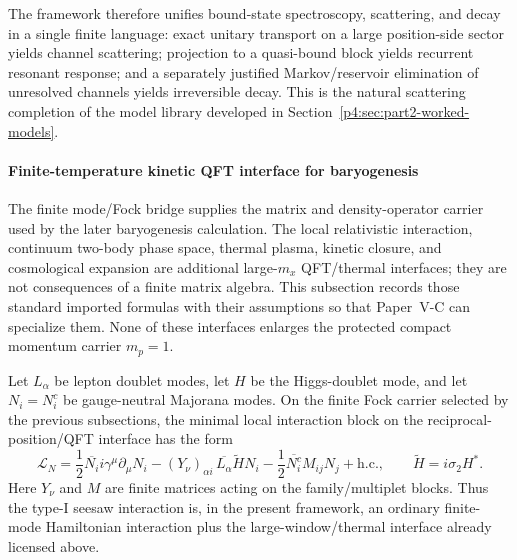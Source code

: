 \documentclass[12pt,a4paper]{article}
\begin{document}
\begin{remark}
\label{p4:rem:scattering-spectroscopy-bridge}
The framework therefore unifies bound-state spectroscopy, scattering, and decay in a single finite language:
exact unitary transport on a large position-side sector yields channel scattering;
projection to a quasi-bound block yields recurrent resonant response; and a
separately justified Markov/reservoir elimination of unresolved channels
yields irreversible decay.
This is the natural scattering completion of the model library developed in Section~\ref{p4:sec:part2-worked-models}.
\end{remark}




\paragraph{Finite-temperature kinetic QFT interface for baryogenesis}
\label{p4:sec:part2-thermal-baryogenesis-qft}

The finite mode/Fock bridge supplies the matrix and density-operator carrier
used by the later baryogenesis calculation.  The local relativistic
interaction, continuum two-body phase space, thermal plasma, kinetic
closure, and cosmological expansion are additional large-\(m_x\)
QFT/thermal interfaces; they are not consequences of a finite matrix algebra.
This subsection records those standard imported formulas with their
assumptions so that Paper~V-C can specialize them.  None of these interfaces
enlarges the protected compact momentum carrier \(m_p=1\).

Let \(L_\alpha\) be lepton doublet modes, let \(H\) be the Higgs-doublet mode, and
let \(N_i=N_i^c\) be gauge-neutral Majorana modes.  On the finite Fock carrier
selected by the previous subsections, the minimal local interaction block on the reciprocal-position/QFT interface has the
form
\begin{equation}
\label{p4:eq:type-I-seesaw-finite-interface}
\mathcal L_{N}
=
\frac12\overline{N_i}i\gamma^\mu\partial_\mu N_i
-
(Y_\nu)_{\alpha i}\,\overline{L_\alpha}\widetilde H N_i
-
\frac12\overline{N_i^c}M_{ij}N_j
+\mathrm{h.c.},
\qquad
\widetilde H=i\sigma_2H^* .
\end{equation}
Here \(Y_\nu\) and \(M\) are finite matrices acting on the family/multiplet blocks.
Thus the type-I seesaw interaction is, in the present framework, an ordinary
finite-mode Hamiltonian interaction plus the large-window/thermal interface
already licensed above.
\end{document}
